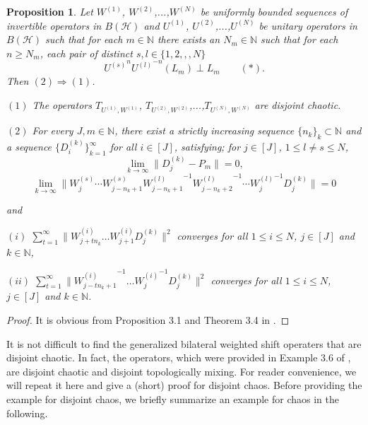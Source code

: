 \documentclass{article}
\newtheorem {proposition}[theorem]{Proposition}
\begin{document}
\begin{proposition}
Let $W^{(1)}$, $W^{(2)}$,...,$W^{(N)}$ be uniformly bounded sequences of invertible operators in $B(\mathcal{H})$ and $U^{(1)}$, $U^{(2)}$,...,$U^{(N)}$ be unitary operators in $B(\mathcal{H})$ such that for each $m\in \mathbb{N}$ there exists an $N_{m}\in\mathbb{N}$ such that for each $n\geq N_{m}$, each pair of distinct $s,l\in \{1,2,,,N\}$
\[{U^{(s)}}^{n}{U^{(l)}}^{-n}(L_{m})\perp L_{m}\textrm{    }\textrm{    }\textrm{    }(\ast).\]
Then $(2)\Rightarrow(1)$.

$(1)$ The operators $T_{U^{(1)},W^{(1)}}$, $T_{U^{(2)},W^{(2)}}$,...,$T_{U^{(N)},W^{(N)}}$ are disjoint chaotic.

$(2)$ For every $J,m \in\mathbb{N}$, there exist a strictly increasing sequence $\{n_{k}\}_{k}\subset \mathbb{N}$ and a sequence
$\{D^{(k)}_{i}\}^{\infty}_{k=1}$ for all $i\in [J]$, satisfying;
for $j\in [J]$, $1\leq l\neq s \leq N$,
\[\lim_{k\rightarrow\infty}\|D^{(k)}_{j}-P_{m}\|=0,\]
\[\lim_{k\rightarrow\infty}\|W^{(s)}_{j}\cdots W^{(s)}_{j-n_{k}+1}{W^{(l)}_{j-n_{k}+1}}^{-1}{W^{(l)}_{j-n_{k}+2}}^{-1}\cdots {W^{(l)}_{j}}^{-1}D^{(k)}_{j}\|=0 \]

and

$(i)$ $\sum^{\infty}_{t=1}\|W^{(i)}_{j+tn_{k}}\ldots W^{(i)}_{j+1}D^{(k)}_{j}\|^{2}$ converges for all $1\leq i\leq N$, $j\in[J]$ and $k\in \mathbb{N}$,

$(ii)$ $\sum^{\infty}_{t=1}\|{W^{(i)}_{j-tn_{k}+1}}^{-1}\ldots {W^{(i)}_{j}}^{-1}D^{(k)}_{j}\|^{2}$ converges for all $1\leq i\leq N$, $j\in[J]$ and $k\in \mathbb{N}$.
\end{proposition}
\begin{proof}
It is obvious from Proposition 3.1 and Theorem 3.4 in \cite{RJ26}.
\end{proof}
It is not difficult to find the generalized bilateral weighted shift operaters that are disjoint chaotic. In fact, the operators, which were provided in Example 3.6 of \cite{RJ26}, are disjoint chaotic and disjoint topologically mixing. For reader convenience, we will repeat it here and give a (short) proof for disjoint chaos. Before providing the example for disjoint chaos, we briefly summarize an example for chaos in the following. 
\end{document}
